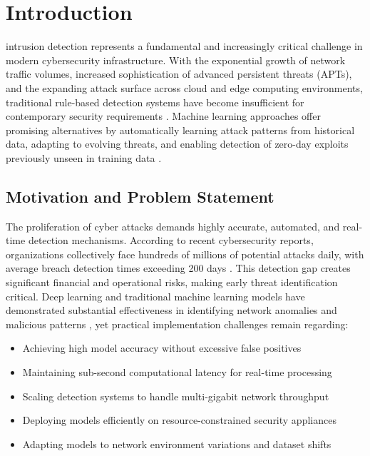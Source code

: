 \documentclass[conference]{IEEEtran}
\begin{document}
\section{Introduction}

 intrusion detection represents a fundamental and increasingly critical challenge in modern cybersecurity infrastructure. With the exponential growth of network traffic volumes, increased sophistication of advanced persistent threats (APTs), and the expanding attack surface across cloud and edge computing environments, traditional rule-based detection systems have become insufficient for contemporary security requirements \cite{ref1}. Machine learning approaches offer promising alternatives by automatically learning attack patterns from historical data, adapting to evolving threats, and enabling detection of zero-day exploits previously unseen in training data \cite{ref2}.

\subsection{Motivation and Problem Statement}

The proliferation of cyber attacks demands highly accurate, automated, and real-time detection mechanisms. According to recent cybersecurity reports, organizations collectively face hundreds of millions of potential attacks daily, with average breach detection times exceeding 200 days \cite{ref3}. This detection gap creates significant financial and operational risks, making early threat identification critical. Deep learning and traditional machine learning models have demonstrated substantial effectiveness in identifying network anomalies and malicious patterns \cite{ref4}, yet practical implementation challenges remain regarding:

\begin{itemize}
    \item Achieving high model accuracy without excessive false positives
    \item Maintaining sub-second computational latency for real-time processing
    \item Scaling detection systems to handle multi-gigabit network throughput
    \item Deploying models efficiently on resource-constrained security appliances
    \item Adapting models to network environment variations and dataset shifts
\end{itemize}
\end{document}
